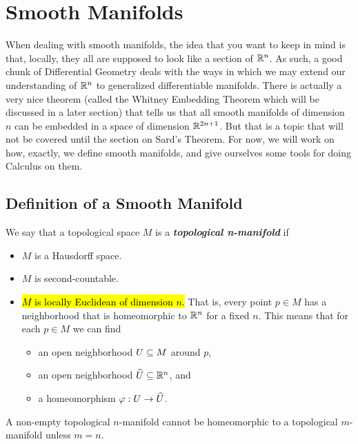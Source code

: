 \newpage
\unappendix
\section{Smooth Manifolds}


When dealing with smooth manifolds, the idea that you want to keep in mind is that, locally, they all are supposed to look like a section of $\mathbb{R}^n$. As such, a good chunk of Differential Geometry deals with the ways in which we may extend our understanding of $\mathbb{R}^n$ to generalized differentiable manifolds. There is actually a very nice theorem (called the Whitney Embedding Theorem which will be discussed in a later section) that tells us that all smooth manifolds of dimension $n$ can be embedded in a space of dimension $\mathbb{R}^{2n + 1}$. But that is a topic that will not be covered until the section on Sard's Theorem. For now, we will work on how, exactly, we define smooth manifolds, and give ourselves some tools for doing Calculus on them.


\subsection{Definition of a Smooth Manifold}
\nl

\dfn We say that a topological space $M$ is a \textbf{\textit{topological n-manifold}} if 
\begin{itemize}
    \item $M$ is a Hausdorff space.
    \item $M$ is second-countable.
    \item \hl{$M$ is locally Euclidean of dimension $n$.} That is, every point $p\in M$ has a neighborhood that is homeomorphic to $\mathbb{R}^n$ for a fixed $n$. This means that for each $p\in M$ we can find
    \begin{itemize}
        \item an open neighborhood $U\subseteq M$ around $p$,
        \item an open neighborhood $\widehat U\subseteq \mathbb{R}^n$, and 
        \item a homeomorphism $\varphi: U\rightarrow \widehat U$.
    \end{itemize}
\end{itemize}


\setcounter{thm}{1}

\begin{thm}
A non-empty topological $n$-manifold cannot be homeomorphic to a topological $m$-manifold unless $m = n$.
\end{thm}

